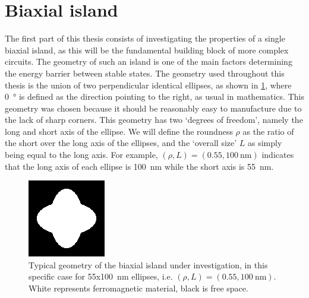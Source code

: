 \documentclass[11pt,a4paper,english]{article}
\begin{document}
\section{Biaxial island}
\label{par:Biaxial_island}
The first part of this thesis consists of investigating the properties of a single biaxial island, as this will be the fundamental building block of more complex circuits. The geometry of such an island is one of the main factors determining the energy barrier between stable states. The geometry used throughout this thesis is the union of two perpendicular identical ellipses, as shown in \cref{fig:biaxial_island:geometryTypical}, where \SI{0}{\degree} is defined as the direction pointing to the right, as usual in mathematics. This geometry was chosen because it should be reasonably easy to manufacture due to the lack of sharp corners. This geometry has two `degrees of freedom', namely the long and short axis of the ellipse. We will define the roundness $\rho$ as the ratio of the short over the long axis of the ellipses, and the `overall size' $L$ as simply being equal to the long axis. For example, $(\rho, L)=(0.55, \SI{100}{\nano\metre})$ indicates that the long axis of each ellipse is \SI{100}{\nano\metre} while the short axis is \SI{55}{\nano\metre}.
\begin{figure}
    \centering
    \includegraphics[width=0.3\columnwidth]{Figures/biaxial_island/Geometry/geomPlus55.png}
    \caption{Typical geometry of the biaxial island under investigation, in this specific case for 55x\SI{100}{\nano\metre} ellipses, i.e. $(\rho, L)=(0.55, \SI{100}{\nano\metre})$. White represents ferromagnetic material, black is free space.}
    \label{fig:biaxial_island:geometryTypical}
\end{figure}
\end{document}
